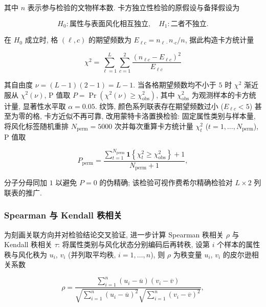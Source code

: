 \documentclass{ctexart}
\begin{document}
其中 $n$ 表示参与检验的文物样本数. 卡方独立性检验的原假设与备择假设为

\begin{equation*}
H_{0}:\text{属性与表面风化相互独立},\quad{H}_{1}:\text{二者不独立}.
\end{equation*}

在 $H_{0}$ 成立时, 格 $\left(\ell,c\right)$ 的期望频数为 $E_{\ell{c}}=n_{\ell\cdot}n_{\cdot{c}}/n$, 据此构造卡方统计量

\begin{equation*}
\chi^{2}=\sum_{\ell=1}^{L}\sum_{c=1}^{2}\frac{\left(n_{\ell{c}}-E_{\ell{c}}\right)^{2}}{E_{\ell{c}}}
\end{equation*}

其自由度 $\nu=\left(L-1\right)\left(2-1\right)=L-1$. 当各格期望频数均不小于 $5$ 时 $\chi^{2}$ 渐近服从 $\chi^{2}\left(\nu\right)$, P 值取 $P=\Pr\left(\chi^{2}\left(\nu\right)\ge\chi_{\mathrm{obs}}^{2}\right)$, 其中 $\chi_{\mathrm{obs}}^{2}$ 为观测样本的卡方统计量, 显著性水平取 $\alpha=0.05$. 纹饰, 颜色系列联表存在期望频数过小 ($E_{\ell{c}}<5$) 甚至为零的格, 卡方近似不再可靠, 改用蒙特卡洛置换检验: 固定属性类别与样本量, 将风化标签随机重排 $N_{\mathrm{perm}}=5000$ 次并每次重算卡方统计量 $\chi_{t}^{2}$ ($t=1,\dots,N_{\mathrm{perm}}$), P 值取

\begin{equation*}
P_{\mathrm{perm}}=\frac{\sum_{t=1}^{N_{\mathrm{perm}}}\mathbf{1}\left\{\chi_{t}^{2}\ge\chi_{\mathrm{obs}}^{2}\right\}+1}{N_{\mathrm{perm}}+1},
\end{equation*}

分子分母同加 $1$ 以避免 $P=0$ 的伪精确; 该检验可视作费希尔精确检验对 $L\times2$ 列联表的推广.


\subsubsection{Spearman 与 Kendall 秩相关}

为刻画关联方向并对检验结论交叉验证, 进一步计算 Spearman 秩相关 $\rho$ 与 Kendall 秩相关 $\tau$: 将属性类别与风化状态分别编码后再转秩, 设第 $i$ 个样本的属性秩与风化秩为 $u_{i}$, $v_{i}$ (并列取平均秩, $i=1,\dots,n$), 则 $\rho$ 为秩变量 $u_{i}$, $v_{i}$ 的皮尔逊相关系数

\begin{equation*}
\rho=\frac{\sum_{i=1}^{n}\left(u_{i}-\overline{u}\right)\left(v_{i}-\overline{v}\right)}{\sqrt{\sum_{i=1}^{n}\left(u_{i}-\overline{u}\right)^{2}}\sqrt{\sum_{i=1}^{n}\left(v_{i}-\overline{v}\right)^{2}}},
\end{equation*}
\end{document}
